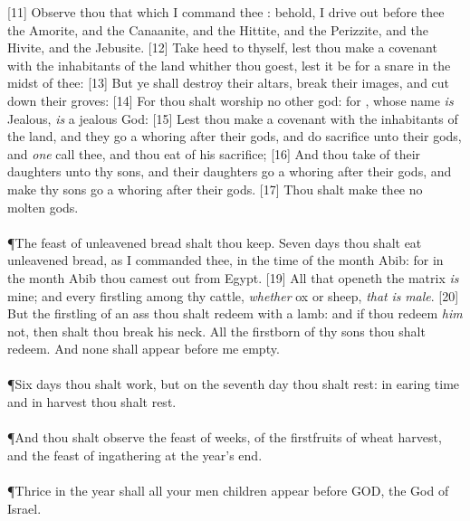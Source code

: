 [11] \textcolor[cmyk]{0.99998,1,0,0}{Observe thou that which I command thee : behold, I drive out before thee the Amorite, and the Canaanite, and the Hittite, and the Perizzite, and the Hivite, and the Jebusite.}
[12] \textcolor[cmyk]{0.99998,1,0,0}{Take heed to thyself, lest thou make a covenant with the inhabitants of the land whither thou goest, lest it be for a snare in the midst of thee:}
[13] \textcolor[cmyk]{0.99998,1,0,0}{But ye shall destroy their altars, break their images, and cut down their groves:}
[14] \textcolor[cmyk]{0.99998,1,0,0}{For thou shalt worship no other god: for   , whose name \emph{is} Jealous, \emph{is} a jealous God:}
[15] \textcolor[cmyk]{0.99998,1,0,0}{Lest thou make a covenant with the inhabitants of the land, and they go a whoring after their gods, and do sacrifice unto their gods, and \emph{one} call thee, and thou eat of his sacrifice;}
[16] \textcolor[cmyk]{0.99998,1,0,0}{And thou take of their daughters unto thy sons, and their daughters go a whoring after their gods, and make thy sons go a whoring after their gods.}
[17] \textcolor[cmyk]{0.99998,1,0,0}{Thou shalt make thee no molten gods.}\\
\\
\P \textcolor[cmyk]{0.99998,1,0,0}{The feast of unleavened bread shalt thou keep. Seven days thou shalt eat unleavened bread, as I commanded thee, in the time of the month Abib: for in the month Abib thou camest out from Egypt.}
[19] \textcolor[cmyk]{0.99998,1,0,0}{All that openeth the matrix \emph{is} mine; and every firstling among thy cattle, \emph{whether} ox or sheep, \emph{that} \emph{is} \emph{male}.}
[20] \textcolor[cmyk]{0.99998,1,0,0}{But the firstling of an ass thou shalt redeem with a lamb: and if thou redeem \emph{him} not, then shalt thou break his neck. All the firstborn of thy sons thou shalt redeem. And none shall appear before me empty.}\\
\\
\P \textcolor[cmyk]{0.99998,1,0,0}{Six days thou shalt work, but on the seventh day thou shalt rest: in earing time and in harvest thou shalt rest.}\\
\\
\P \textcolor[cmyk]{0.99998,1,0,0}{And thou shalt observe the feast of weeks, of the firstfruits of wheat harvest, and the feast of ingathering at the year's end.}\\
\\
\P \textcolor[cmyk]{0.99998,1,0,0}{Thrice in the year shall all your men children appear before  GOD, the God of Israel.}
